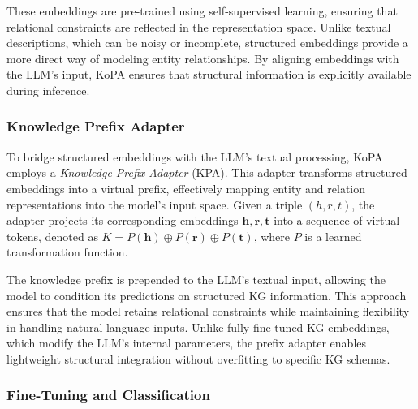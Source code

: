 \documentclass[12pt,a4paper]{article}
\begin{document}
These embeddings are pre-trained using self-supervised learning, ensuring that relational constraints are reflected in the representation space.
Unlike textual descriptions, which can be noisy or incomplete, structured embeddings provide a more direct way of modeling entity relationships.
By aligning embeddings with the LLM’s input, KoPA ensures that structural information is explicitly available during inference.

\subsubsection{Knowledge Prefix Adapter}

To bridge structured embeddings with the LLM’s textual processing, KoPA employs a \textit{Knowledge Prefix Adapter} (KPA).
This adapter transforms structured embeddings into a virtual prefix, effectively mapping entity and relation representations into the model’s input space. Given a triple \( (h, r, t) \), the adapter projects its corresponding embeddings \( \mathbf{h}, \mathbf{r}, \mathbf{t} \) into a sequence of virtual tokens, denoted as \( K = P(\mathbf{h}) \oplus P(\mathbf{r}) \oplus P(\mathbf{t}) \), where \( P \) is a learned transformation function.

The knowledge prefix is prepended to the LLM’s textual input, allowing the model to condition its predictions on structured KG information.
This approach ensures that the model retains relational constraints while maintaining flexibility in handling natural language inputs.
Unlike fully fine-tuned KG embeddings, which modify the LLM’s internal parameters, the prefix adapter enables lightweight structural integration without overfitting to specific KG schemas.

\subsubsection{Fine-Tuning and Classification}
\end{document}
